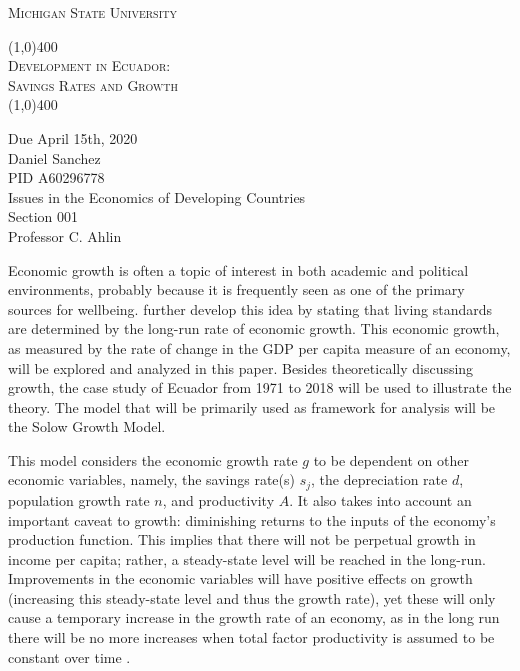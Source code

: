 \documentclass[12pt,twoside,a4paper]{article}
\numberwithin{equation}{section}
\begin{document}
\begin{titlepage}
\centering
\textsc{\large{Michigan State University}}
\vspace{3cm}\\ 
\begin{Huge}
 \line(1,0){400}\\
\textsc{Development in Ecuador:}\\
\textsc{Savings Rates and Growth}\\
 \line(1,0){400}
\end{Huge}
\vspace{8cm}
\flushleft 
\begin{large}
Due April 15th, 2020\\
Daniel Sanchez \\
PID A60296778\\
Issues in the Economics of Developing Countries\\
Section 001 \\
Professor C. Ahlin \\
\end{large}

\end{titlepage}
\listoffigures
\clearpage
Economic growth is often a topic of interest in both academic and political environments, probably because it is frequently seen as one of the primary sources for wellbeing. \textcite{Abel.2014} further develop this idea by stating that living standards are determined by the long-run rate of economic growth. This economic growth, as measured by the rate of change in the GDP per capita measure of an economy, will be explored and analyzed in this paper. Besides theoretically discussing growth, the case study of Ecuador from 1971 to 2018 will be used to illustrate the theory.  The model that will be primarily used as framework for analysis will be the Solow Growth Model. 

This model considers the economic growth rate $g$ to be dependent on other economic variables, namely, the savings rate(s) $s_j$, the depreciation rate $d$, population growth rate $n$, and productivity $A$. It also takes into account an important caveat to growth: diminishing returns to the inputs of the economy’s production function. This implies that there will not be perpetual growth in income per capita; rather, a steady-state level will be reached in the long-run. Improvements in the economic variables will have positive effects on growth (increasing this steady-state level and thus the growth rate), yet these will only cause a temporary increase in the growth rate of an economy, as in the long run there will be no more increases when total factor productivity is assumed to be constant over time \parencite{Williamson.2014}.
\end{document}
